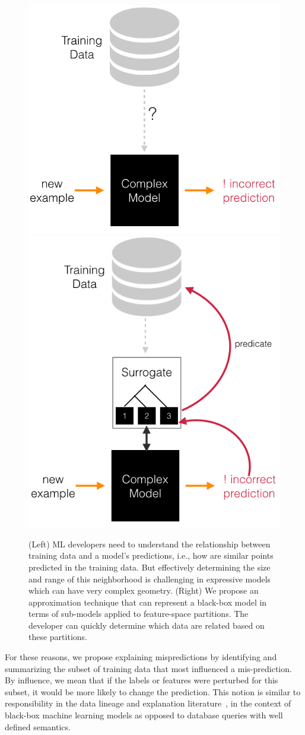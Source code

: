 \begin{figure}
    \centering
    \includegraphics[width=0.48\columnwidth]{figures/teaser1.png}
    \includegraphics[width=0.48\columnwidth]{figures/teaser2.png}
    \caption{(Left) ML developers need to understand the relationship between training data and a model's predictions, i.e., how are similar points predicted in the training data. But effectively determining the size and range of this neighborhood is challenging in expressive models which can have very complex geometry. (Right) We propose an approximation technique that can represent a black-box model in terms of sub-models applied to feature-space partitions. The developer can quickly determine which data are related based on these partitions.}
    \label{fig:my_label}
\end{figure}



For these reasons, we propose explaining mispredictions by identifying and summarizing the subset of training data that most influenced a mis-prediction.
By influence, we mean that if the labels or features were perturbed for this subset, it would be more likely to change the prediction.
This notion is similar to responsibility in the data lineage and explanation literature~\cite{scorpion,alexandra,reversedatamanagamente,semirings}, in the context of black-box machine learning models as opposed to database queries with well defined semantics.

